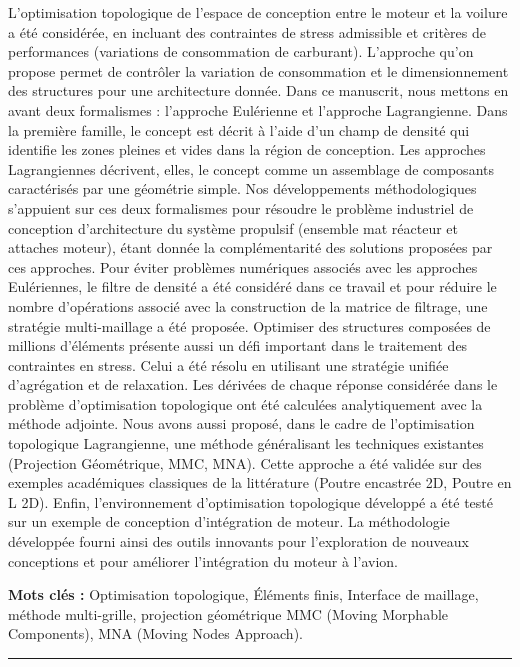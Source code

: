 L'optimisation topologique de l'espace de conception entre le moteur et la voilure a été considérée, en incluant des contraintes de stress admissible et critères de performances (variations de consommation de carburant). L'approche qu'on propose permet de contrôler la variation de consommation et le dimensionnement des structures pour une architecture donnée. 
Dans ce manuscrit, nous mettons en avant deux formalismes : l’approche Eulérienne et l’approche Lagrangienne. Dans la première famille, le concept est décrit à l'aide d'un champ de densité qui identifie les zones pleines et vides dans la région de conception. Les approches Lagrangiennes décrivent, elles, le concept comme un assemblage de composants caractérisés par une géométrie simple.
Nos développements méthodologiques s'appuient sur ces deux formalismes pour résoudre le problème industriel de conception d'architecture du système propulsif (ensemble mat réacteur et attaches moteur), étant donnée la complémentarité des solutions proposées par ces approches. 
Pour éviter problèmes numériques associés avec les approches Eulériennes, le filtre de densité a été considéré dans ce travail et pour réduire le nombre d'opérations associé avec la construction de la matrice de filtrage, une stratégie multi-maillage a été proposée.
Optimiser des structures composées de millions d’éléments présente aussi un défi important dans le traitement des contraintes en stress. Celui a été résolu en utilisant une stratégie unifiée d'agrégation et de relaxation. Les dérivées de chaque réponse considérée dans le problème d'optimisation topologique ont été calculées analytiquement avec la méthode adjointe. 
Nous avons aussi proposé, dans le cadre de l’optimisation topologique Lagrangienne, une méthode généralisant les techniques existantes (Projection Géométrique, MMC, MNA). Cette approche a été validée sur des exemples académiques classiques de la littérature (Poutre encastrée 2D, Poutre en L 2D). Enfin, l'environnement d’optimisation topologique développé a été testé sur un exemple de conception d'intégration  de moteur. La méthodologie développée fourni ainsi des outils innovants pour l'exploration de nouveaux conceptions et pour améliorer l'intégration du moteur à l'avion.

{\large\textbf{Mots clés :}}
    Optimisation topologique, Éléments finis, Interface de maillage, méthode multi-grille, projection géométrique  MMC (Moving Morphable Components), MNA (Moving Nodes Approach).
\\
\noindent\rule[2pt]{\textwidth}{0.5pt}



